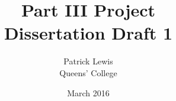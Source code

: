 \documentclass[11pt, oneside]{report}
\title{Part III Project \\Dissertation Draft 1}
\author{Patrick Lewis \\Queens' College}
\date{March 2016}							%
\begin{document}
\maketitle
\begin{abstract}

\end{abstract}
\tableofcontents
\listoffigures











\end{document}

